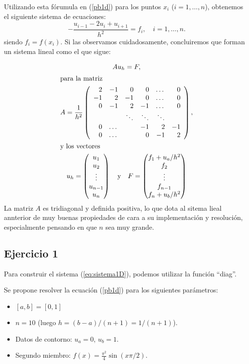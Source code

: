 \documentclass[11pt,spanish,a4wide]{article}
\begin{document}
Utilizando esta fórumula en (\ref{pb1d}) para los puntos $x_i$
($i=1,\dots,n$), obtenemos el siguiente sistema de ecuaciones:
$$
-\frac{u_{i-1}-2u_i + u_{i+1}}{h^2} = f_i, \quad i=1,\dots,n.
$$
siendo $f_i=f(x_i)$.
Si las observamos cuidadosamente, concluiremos que forman un sistema
lineal como el que sigue:

\begin{gather}
Au_h=F,\label{eq:sistema1D} \\
\intertext{para la matriz}
A=\frac{1}{h^2}\left(
\begin{array}{rrrrrr}
   2 & -1 &  0 &  0 & \dots & 0 \\
  -1 &  2 & -1 &  0 & \dots & 0 \\
   0 & -1 &  2 & -1 & \dots & 0 \\
     &    & \ddots & \ddots & \ddots \\
   0 & \dots & & -1 & 2  & -1 \\
   0 & \dots & & 0 & -1 & 2
 \end{array}
\right),
\\
\intertext{y los vectores}
u_h=
\begin{pmatrix}
  u_1 \\ u_2 \\ \vdots \\ u_{n-1} \\ u_n
\end{pmatrix}
%
\quad \mbox{y}  \quad
F=
\begin{pmatrix}
  f_1 + u_a/h^2 \\ f_2 \\ \vdots \\ f_{n-1} \\ f_n+u_b/h^2
\end{pmatrix}
\end{gather}
La matriz $A$ es tridiagonal y definida positiva, lo que dota al
sitema lieal annterior de muy buenas propiedades de cara a su
implementación y resolución, especialmente pensando en que $n$ sea muy
grande.

\subsection{Ejercicio 1}
Para construir el sistema (\ref{eq:sistema1D}), podemos utilizar la
función ``diag''.

Se propone resolver la ecuación (\ref{pb1d}) para los siguientes
parámetros:
\begin{itemize}
\item $[a,b]=[0,1]$
\item $n= 10$ (luego $h = (b-a)/(n+1)=1/(n+1)$).
\item Datos de contorno: $u_a=0$, $u_b=1$.
\item Segundo miembro: $f(x)=\frac{\pi^2}{4}  \sin(x\pi/2)$.
\end{itemize}
\end{document}
